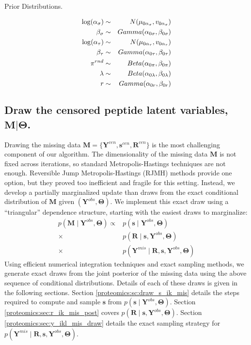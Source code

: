\begin{table}
\caption{Prior Distributions.}
\begin{eqnarray*}
\log(\alpha_\sigma) &\sim& N(\mu_{0 \alpha_\sigma}, v_{0 \alpha_\sigma}) \\
\beta_\sigma &\sim& Gamma(\alpha_{0 \sigma}, \beta_{0 \sigma}) \\
\log(\alpha_\tau) &\sim& N(\mu_{0 \alpha_\tau}, v_{0 \alpha_\tau}) \\
\beta_\tau &\sim& Gamma(\alpha_{0 \tau}, \beta_{0 \tau}) \\
\mbox{\ensuremath{\pi}}^{rnd} & \sim & Beta(\alpha_{0\pi}, \beta_{0\pi})\\
\lambda & \sim & Beta(\alpha_{0 \lambda}, \beta_{0 \lambda})\\
r & \sim & Gamma(\alpha_{0r}, \beta_{0r})
\end{eqnarray*}
\end{table}


\subsection{Draw the censored peptide latent variables, $\mathbf{M} \vert \bm \Theta$.}
\label{proteomics:sec:missingDataDraw}

Drawing the missing data $\mathbf{M}=\{\mathbf{Y}^{cen},\mathbf{s}^{cen},\mathbf{R}^{cen}\}$ is the most challenging component of our algorithm.
The dimensionality of the missing data $\mathbf{M}$ is not fixed across iterations, so standard Metropolis-Hastings techniques are not enough.
Reversible Jump Metropolis-Hastings (RJMH) methods provide one option, but they proved too inefficient and fragile for this setting.
Instead, we develop a partially marginalized update than draws from the exact conditional distribution of $\bm M$ given $(\bm Y^{obs}, \bm \Theta)$.
We implement this exact draw using a ``triangular'' dependence structure, starting with the easiest draws to marginalize:
%
\begin{align}
p( \bm M \mid \bm{Y}^{obs}, \bm{\Theta}) \propto & p(\bm s \mid \bm {Y}^{obs}, \bm{\Theta}) \\
\nonumber
 \times & p(\bm{R} \mid \bm s, \bm{Y}^{obs}, \bm{\Theta}) \\
\nonumber
 \times & p(\bm{Y}^{mis} \mid \bm{R}, \bm{s}, \bm{Y}^{obs}, \bm{\Theta})
\end{align}
%
Using efficient numerical integration techniques and exact sampling methods, we generate exact draws from the joint posterior of the missing data using the above sequence of conditional distributions.
Details of each of these draws is given in the following sections.
Section \ref{proteomics:sc:draw_s_ik_mis} details the steps required to compute and sample $\bm s$ from $p(\bm s \mid \bm {Y}^{obs}, \bm{\Theta})$.
Section \ref{proteomics:sec:r_ik_mis_post} covers $p(\bm{R} \mid \bm s, \bm{Y}^{obs}, \bm{\Theta})$.
Section \ref{proteomics:sec:y_ikl_mis_draw} details the exact sampling strategy for $p(\bm{Y}^{mis} \mid \bm{R}, \bm{s}, \bm{Y}^{obs}, \bm{\Theta})$.

